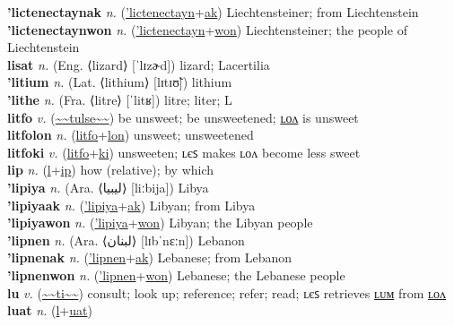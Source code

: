 \textbf{'lictenectaynak} \textit{n.} (\hyperref['lictenectayn]{'lictenectayn}+\hyperref[ak]{ak})
Liechtensteiner; from Liechtenstein \label{'lictenectaynak} \\
\textbf{'lictenectaynwon} \textit{n.} (\hyperref['lictenectayn]{'lictenectayn}+\hyperref[won]{won})
Liechtensteiner; the people of Liechtenstein \label{'lictenectaynwon} \\
\textbf{lisat} \textit{n.} (Eng. ⟨lizard⟩ [ˈlɪzɚd])
lizard; Lacertilia \label{lisat} \\
\textbf{'litium} \textit{n.} (Lat. ⟨lithium⟩ [lɪtɪʊ̃])
lithium \label{'litium} \\
\textbf{'lithe} \textit{n.} (Fra. ⟨litre⟩ [ˈlitʁ])
litre; liter; L \label{'lithe} \\
\textbf{litfo} \textit{v.} (\hyperref[tulse]{\~{}\~{}tulse\~{}\~{}})
be unsweet; be unsweetened; \hyperref[litfolon]{ʟᴏᴧ} is unsweet \label{litfo} \\
\textbf{litfolon} \textit{n.} (\hyperref[litfo]{litfo}+\hyperref[lon]{lon})
unsweet; unsweetened \label{litfolon} \\
\textbf{litfoki} \textit{v.} (\hyperref[litfo]{litfo}+\hyperref[ki]{ki})
unsweeten; ʟєꜱ makes ʟᴏᴧ become less sweet \label{litfoki} \\
\textbf{lip} \textit{n.} (\hyperref[l]{l}+\hyperref[p]{ip})
how (relative); by which \label{lip} \\
\textbf{'lipiya} \textit{n.} (Ara. ⟨ليبيا‎⟩ [liːbija])
Libya \label{'lipiya} \\
\textbf{'lipiyaak} \textit{n.} (\hyperref['lipiya]{'lipiya}+\hyperref[ak]{ak})
Libyan; from Libya \label{'lipiyaak} \\
\textbf{'lipiyawon} \textit{n.} (\hyperref['lipiya]{'lipiya}+\hyperref[won]{won})
Libyan; the Libyan people \label{'lipiyawon} \\
\textbf{'lipnen} \textit{n.} (Ara. ⟨لبنان‎⟩ [lɪbˈnɛːn])
Lebanon \label{'lipnen} \\
\textbf{'lipnenak} \textit{n.} (\hyperref['lipnen]{'lipnen}+\hyperref[ak]{ak})
Lebanese; from Lebanon \label{'lipnenak} \\
\textbf{'lipnenwon} \textit{n.} (\hyperref['lipnen]{'lipnen}+\hyperref[won]{won})
Lebanese; the Lebanese people \label{'lipnenwon} \\
\textbf{lu} \textit{v.} (\hyperref[ti]{\~{}\~{}ti\~{}\~{}})
consult; look up; reference; refer; read; ʟєꜱ retrieves \hyperref[lulum]{ʟᴜᴍ} from \hyperref[lulon]{ʟᴏᴧ} \label{lu} \\
\textbf{luat} \textit{n.} (\hyperref[l]{l}+\hyperref[at]{uat})

